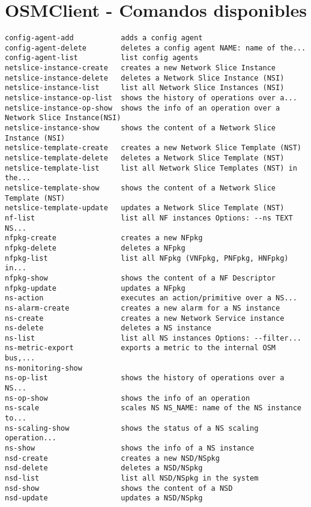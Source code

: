 \chapter{OSMClient - Comandos disponibles}
\label{sec:anexoosmclient}

\begin{lstlisting}
config-agent-add           adds a config agent
config-agent-delete        deletes a config agent NAME: name of the...
config-agent-list          list config agents
netslice-instance-create   creates a new Network Slice Instance
netslice-instance-delete   deletes a Network Slice Instance (NSI)
netslice-instance-list     list all Network Slice Instances (NSI)
netslice-instance-op-list  shows the history of operations over a...
netslice-instance-op-show  shows the info of an operation over a Network Slice Instance(NSI)
netslice-instance-show     shows the content of a Network Slice Instance (NSI)
netslice-template-create   creates a new Network Slice Template (NST)
netslice-template-delete   deletes a Network Slice Template (NST)
netslice-template-list     list all Network Slice Templates (NST) in the...
netslice-template-show     shows the content of a Network Slice Template (NST)
netslice-template-update   updates a Network Slice Template (NST)
nf-list                    list all NF instances Options: --ns TEXT NS...
nfpkg-create               creates a new NFpkg
nfpkg-delete               deletes a NFpkg
nfpkg-list                 list all NFpkg (VNFpkg, PNFpkg, HNFpkg) in...
nfpkg-show                 shows the content of a NF Descriptor
nfpkg-update               updates a NFpkg
ns-action                  executes an action/primitive over a NS...
ns-alarm-create            creates a new alarm for a NS instance
ns-create                  creates a new Network Service instance
ns-delete                  deletes a NS instance
ns-list                    list all NS instances Options: --filter...
ns-metric-export           exports a metric to the internal OSM bus,...
ns-monitoring-show
ns-op-list                 shows the history of operations over a NS...
ns-op-show                 shows the info of an operation
ns-scale                   scales NS NS_NAME: name of the NS instance to...
ns-scaling-show            shows the status of a NS scaling operation...
ns-show                    shows the info of a NS instance
nsd-create                 creates a new NSD/NSpkg
nsd-delete                 deletes a NSD/NSpkg
nsd-list                   list all NSD/NSpkg in the system
nsd-show                   shows the content of a NSD
nsd-update                 updates a NSD/NSpkg

\end{lstlisting}
